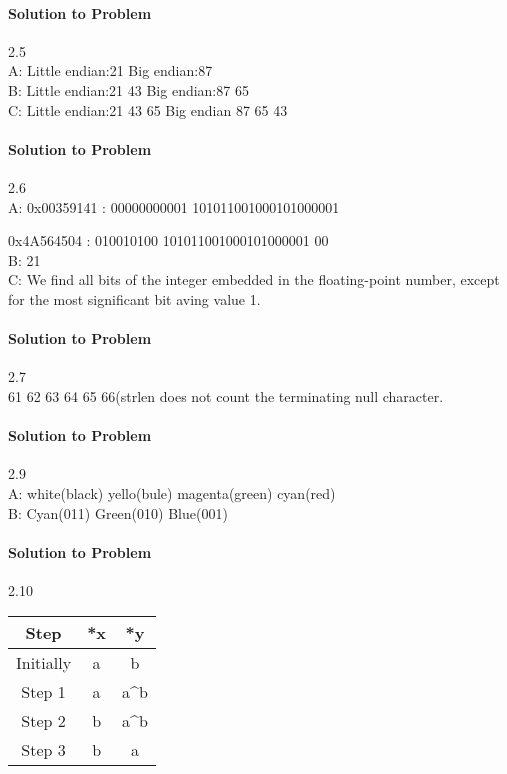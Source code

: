 \documentclass{report}
\begin{document}
\paragraph{Solution to Problem} 2.5 \\
A: Little endian:21 \hspace{10mm} Big endian:87 \\
B: Little endian:21 43 \hspace{6mm} Big endian:87 65 \\
C: Little endian:21 43 65 \hspace{1mm} Big endian 87 65 43

\paragraph{Solution to Problem} 2.6  \\
A: 0x00359141 : 00000000001 101011001000101000001 

0x4A564504 : \hspace{1mm} 010010100 101011001000101000001 00 \\
B: 21 \\
C: We find all bits of the integer embedded in the floating-point number, except for the most significant bit aving value 1.

\paragraph{Solution to Problem} 2.7 \\
61 62 63 64 65 66(strlen does not count the terminating null character.

\paragraph{Solution to Problem} 2.9 \\
A: white(black) yello(bule) magenta(green) cyan(red) \\
B: Cyan(011) Green(010) Blue(001)

\paragraph{Solution to Problem} 2.10
\begin{center}
\begin{tabular}{ |c|c|c| } 
\hline
Step & *x & *y \\
\hline\hline
Initially & a & b \\
\hline
Step 1 & a & a\textasciicircum b \\   
\hline  
Step 2 & b & a\textasciicircum b \\
\hline
Step 3 & b & a \\
\hline
\end{tabular}
\end{center}
\end{document}
